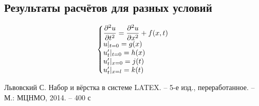 \documentclass[12pt,a4paper,russian]{report}
\begin{document}
	\subsection{Результаты расчётов для разных условий}
	
	
	$$
	\left\{\begin{array}{@{}l@{}}
		\displaystyle \frac{\partial^2u}{\partial t^2} = \frac{\partial^2u}{\partial x^2} + f(x, t) \\
		u|_{t=0} = g(x) \\
		u'_{t}|_{t=0} = h(x) \\
		u'_t|_{x=0} = j(t) \\
		u'_t|_{x=l} = k(t)
	\end{array}\right.\,
	$$

	\newpage
	\makeatletter
	\begin{thebibliography}{99}
		
		 Львовский С. Набор и вёрстка в системе LATEX. -- 5-е изд., переработанное. -- М.: МЦНМО, 2014. -- 400 с
		
		
	\end{thebibliography}
	
\end{document}
